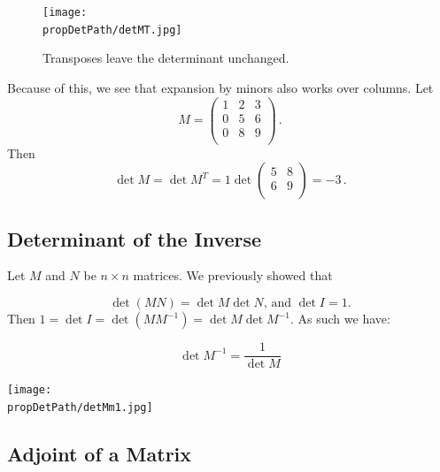 \begin{figure}
\begin{center}
\texttt{[image: \\propDetPath/detMT.jpg]}
\end{center}
\caption{Transposes leave the determinant unchanged.}
\end{figure}

\begin{example}
Because of this, we see that expansion by minors also works over columns.  Let \[M=\begin{pmatrix}
1 & 2 & 3 \\
0 & 5 & 6 \\
0 & 8 & 9 \\
\end{pmatrix}\, .\]  Then \[\det M = \det M^T = 1\det \begin{pmatrix}
5 & 8 \\
6 & 9 \\
\end{pmatrix}=-3\, .\]
\end{example}

\subsection{Determinant of the Inverse}

Let $M$ and $N$ be $n\times n$ matrices.
We previously showed that 

\[
\det (MN)=\det M \det N \text{, and } \det I=1.
\]
Then $1 = \det I = \det (MM^{-1}) = \det M \det M^{-1}$.  As such we have:
\begin{theorem}
\[
\det M^{-1} = \frac{1}{\det M}
\]
\end{theorem}

\begin{center}
\texttt{[image: \\propDetPath/detMm1.jpg]}
\end{center}


\subsection{Adjoint of a Matrix}


